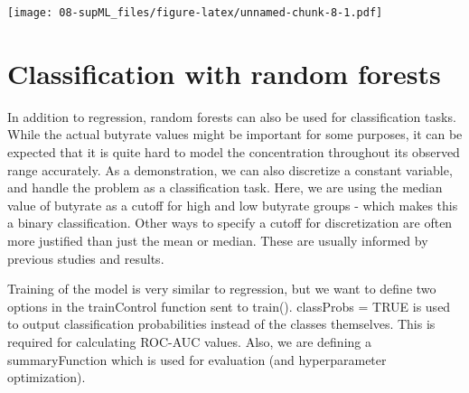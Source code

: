 \documentclass[
  oneside]{book}
\newenvironment{Shaded}{\begin{snugshade}}{\end{snugshade}}
\newcommand{\FunctionTok}[1]{\textcolor[rgb]{0.00,0.00,0.00}{#1}}
\newcommand{\NormalTok}[1]{#1}
\newcommand{\OtherTok}[1]{\textcolor[rgb]{0.56,0.35,0.01}{#1}}
\newcommand{\SpecialCharTok}[1]{\textcolor[rgb]{0.00,0.00,0.00}{#1}}
\newcommand{\StringTok}[1]{\textcolor[rgb]{0.31,0.60,0.02}{#1}}
\begin{document}
\texttt{[image: 08-supML\_files/figure-latex/unnamed-chunk-8-1.pdf]}

\hypertarget{classification-with-random-forests}{%
\section{Classification with random forests}\label{classification-with-random-forests}}

In addition to regression, random forests can also be used for classification tasks.
While the actual butyrate values might be important for some purposes, it can be
expected that it is quite hard to model the concentration throughout its observed
range accurately. As a demonstration, we can also discretize a constant variable,
and handle the problem as a classification task. Here, we are using the median value
of butyrate as a cutoff for high and low butyrate groups - which makes this a binary
classification. Other ways to specify a cutoff for discretization are often more
justified than just the mean or median. These are usually informed by previous studies
and results.

\begin{Shaded}
\end{Shaded}

Training of the model is very similar to regression, but we want to define two options in the
trainControl function sent to train(). classProbs = TRUE is used to output classification
probabilities instead of the classes themselves. This is required for calculating
ROC-AUC values. Also, we are defining a summaryFunction which is used for evaluation
(and hyperparameter optimization).
\end{document}
